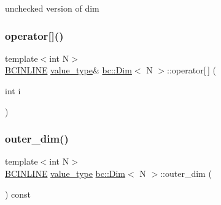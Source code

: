 unchecked version of dim 

\mbox{\label{structbc_1_1Dim_adbc11f0e5716ec016a452922afeb64a9}} 
\subsubsection{\texorpdfstring{operator[]()}{operator[]()}\hspace{0.1cm}{\footnotesize\ttfamily [2/2]}}
{\footnotesize\ttfamily template$<$int N$>$ \\
\hyperlink{common_8h_a6699e8b0449da5c0fafb878e59c1d4b1}{B\+C\+I\+N\+L\+I\+NE} \hyperlink{structbc_1_1Dim_af59ff554825273cf6bd9619b2c78c196}{value\+\_\+type}\& \hyperlink{structbc_1_1Dim}{bc\+::\+Dim}$<$ N $>$\+::operator\mbox{[}$\,$\mbox{]} (\begin{DoxyParamCaption}\item[{int}]{i }\end{DoxyParamCaption})\hspace{0.3cm}{\ttfamily [inline]}}

\mbox{\label{structbc_1_1Dim_a5d5e00f81269d265ae0095f4833f9cea}} 
\subsubsection{\texorpdfstring{outer\+\_\+dim()}{outer\_dim()}}
{\footnotesize\ttfamily template$<$int N$>$ \\
\hyperlink{common_8h_a6699e8b0449da5c0fafb878e59c1d4b1}{B\+C\+I\+N\+L\+I\+NE} \hyperlink{structbc_1_1Dim_af59ff554825273cf6bd9619b2c78c196}{value\+\_\+type} \hyperlink{structbc_1_1Dim}{bc\+::\+Dim}$<$ N $>$\+::outer\+\_\+dim (\begin{DoxyParamCaption}{ }\end{DoxyParamCaption}) const\hspace{0.3cm}{\ttfamily [inline]}}

\mbox{\label{structbc_1_1Dim_a2a7edc4db3cda7562914c30b5ca7b85b}} 
